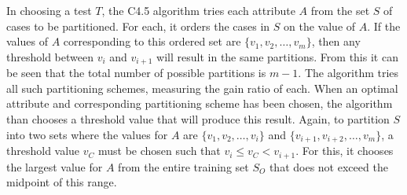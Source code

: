 \documentclass[main.tex]{subfiles}
\begin{document}
In choosing a test $T$, the C4.5 algorithm tries each attribute $A$ from the set $S$ of cases to be partitioned. For each, it orders the cases in $S$ on the value of $A$. If the values of $A$ corresponding to this ordered set are $\{v_1,v_2,\ldots,v_m\}$, then any threshold between $v_i$ and $v_{i+1}$ will result in the same partitions. From this it can be seen that the total number of possible partitions is $m-1$. The algorithm tries all such partitioning schemes, measuring the gain ratio of each. When an optimal attribute and corresponding partitioning scheme has been chosen, the algorithm than chooses a threshold value that will produce this result. Again, to partition $S$ into two sets where the values for $A$ are $\{v_1,v_2,\ldots,v_i\}$ and $\{v_{i+1},v_{i+2},\ldots,v_m\}$, a threshold value $v_C$ must be chosen such that $v_i \leq v_C < v_{i+1}$. For this, it chooses the largest value for $A$ from the entire training set $S_O$ that does not exceed the midpoint of this range. 



\biblio
\end{document}
